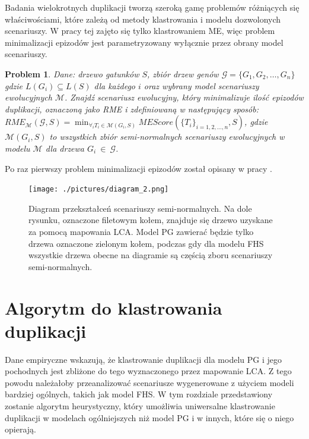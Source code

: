 \documentclass[licencjacka]{pracamgr}
\begin{document}
Badania wielokrotnych duplikacji tworzą szeroką gamę problemów różniących się właściwościami, które zależą od metody klastrowania i modelu dozwolonych scenariuszy. W pracy tej zajęto się tylko klastrowaniem ME, więc problem minimalizacji epizodów jest parametryzowany wyłącznie przez obrany model scenariuszy. 

\newtheorem{problem}{Problem}
\begin{problem}
  Dane: drzewo gatunków $S$, zbiór drzew genów $\mathcal{G}=\{G_1,G_2, \dots , G_n\}$ gdzie $L(G_i) \subseteq L(S)$ dla każdego $i$ oraz  wybrany model scenariuszy ewolucyjnych $\mathcal{M}$. Znajdź scenariusz ewolucyjny, który minimalizuje ilość epizodów duplikacji, oznaczoną jako RME i zdefiniowaną w następujący sposób:
  ${RME}_{\mathcal{M}}(\mathcal{G}, S) = \min_{\forall_i T_i \in \mathcal{M}(G_i,S)}MEScore(\lbrace T_i \rbrace_{i=1,2,\dots,n},S)$, gdzie $\mathcal{M}(G_i,S)$ to wszystkich zbiór semi-normalnych scenariuszy ewolucyjnych w modelu $\mathcal{M}$ dla drzewa $G_i~\in~\mathcal{G}$.
\end{problem}

Po raz pierwszy problem minimalizacji epizodów został opisany w pracy \cite{Guigo1996}.

\begin{figure}[t]\label{diagram_red}
  \centering
  \texttt{[image: ./pictures/diagram\_2.png]}
  \caption{Diagram przekształceń scenariuszy semi-normalnych. Na dole rysunku, oznaczone filetowym kołem, znajduje się drzewo uzyskane za pomocą mapowania LCA. Model PG zawierać będzie tylko drzewa oznaczone zielonym kołem, podczas gdy dla modelu FHS wszystkie drzewa obecne na diagramie są częścią zboru scenariuszy semi-normalnych.}
\end{figure}


\chapter{Algorytm do klastrowania duplikacji}\label{r:heurystyka}
Dane empiryczne wskazują, że klastrowanie duplikacji dla modelu PG i jego pochodnych jest zbliżone do tego wyznaczonego przez mapowanie LCA. Z tego powodu należałoby przeanalizować scenariusze wygenerowane z użyciem modeli bardziej ogólnych, takich jak model FHS. W tym rozdziale przedstawiony zostanie algorytm heurystyczny, który umożliwia uniwersalne klastrowanie duplikacji w modelach ogólniejszych niż model PG i w innych, które się o niego opierają.
\end{document}
